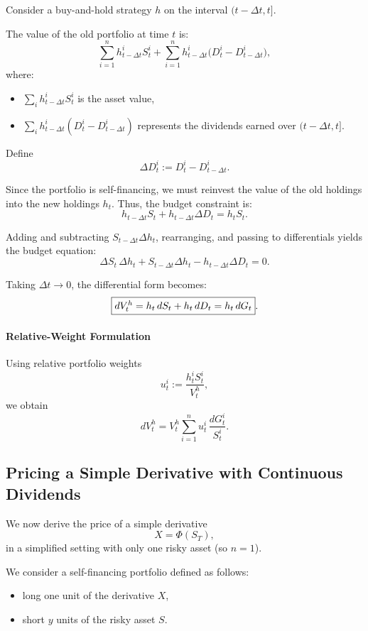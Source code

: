 \documentclass[12pt,a4paper]{article}
\theoremstyle{definition}
\begin{document}
Consider a buy-and-hold strategy $h$ on the interval $(t-\Delta t, t]$.

The value of the old portfolio at time $t$ is:
\[
\sum_{i=1}^n h_{t-\Delta t}^i S_t^i + \sum_{i=1}^n h_{t-\Delta t}^i \big(D_t^i - D_{t-\Delta t}^i\big),
\]
where:
\begin{itemize}
\item $\sum_i h_{t-\Delta t}^i S_t^i$ is the asset value,
\item $\sum_i h_{t-\Delta t}^i (D_t^i - D_{t-\Delta t}^i)$ represents the dividends earned over $(t-\Delta t, t]$.
\end{itemize}

Define
\[
\Delta D_t^i := D_t^i - D_{t-\Delta t}^i.
\]

Since the portfolio is self-financing, we must reinvest the value of the old holdings into the new holdings $h_t$. Thus, the budget constraint is:
\[
h_{t-\Delta t} S_t + h_{t-\Delta t}\Delta D_t = h_t S_t.
\]

Adding and subtracting $S_{t-\Delta t} \Delta h_t$, rearranging, and passing to differentials yields the budget equation:
\[
\Delta S_t\, \Delta h_t + S_{t-\Delta t}\Delta h_t - h_{t-\Delta t}\Delta D_t = 0.
\]

Taking $\Delta t \to 0$, the differential form becomes:
\[
\fbox{$dV_t^h = h_t\, dS_t + h_t\, dD_t = h_t\, dG_t$}.
\]

\paragraph{Relative-Weight Formulation}

Using relative portfolio weights
\[
u_t^i := \frac{h_t^i S_t^i}{V_t^h},
\]
we obtain
\[
dV_t^h = V_t^h \sum_{i=1}^n u_t^i\, \frac{dG_t^i}{S_t^i}.
\]

\subsection{Pricing a Simple Derivative with Continuous Dividends}

We now derive the price of a simple derivative
\[
X = \Phi(S_T),
\]
in a simplified setting with only one risky asset (so $n = 1$).

We consider a self-financing portfolio defined as follows:
\begin{itemize}
\item long one unit of the derivative $X$,
\item short $y$ units of the risky asset $S$.
\end{itemize}
\end{document}
